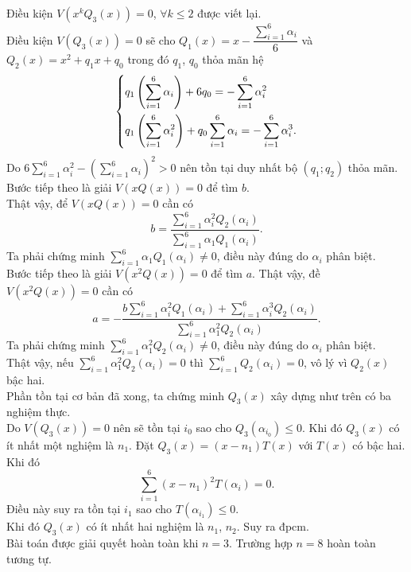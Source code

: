 \begin{bt}
{		Điều kiện $V\left(x^kQ_3(x)\right)=0$, $\forall k\le 2$ được viết lại.\\
		Điều kiện $V\left(Q_3(x)\right)=0$ sẽ cho $Q_1(x)=x-\dfrac{\displaystyle\sum_{i=1}^6\alpha_i}{6}$ và $Q_2(x)=x^2+q_1x+q_0$ trong đó $q_1$, $q_0$ thỏa mãn hệ
		$$\left\{\begin{aligned} & q_1\left(\displaystyle\sum_{i=1}^6\alpha_i\right)+6q_0=-\displaystyle\sum_{i=1}^6\alpha_i^2\\
			& q_1\left(\displaystyle\sum_{i=1}^6\alpha_i^2\right)+q_0\displaystyle\sum_{i=1}^6\alpha_i=-\displaystyle\sum_{i=1}^6\alpha_i^3.\end{aligned}\right.$$
		Do $6\displaystyle\sum_{i=1}^6\alpha_i^2-\left(\displaystyle\sum_{i=1}^6\alpha_i\right)^2>0$ nên tồn tại duy nhất bộ $(q_1;q_2)$ thỏa mãn.\\
		Bước tiếp theo là giải $V(xQ(x))=0$ để tìm $b$.\\
		Thật vậy, để $V\left(xQ(x)\right)=0$ cần có
		$$b=\dfrac{\displaystyle\sum_{i=1}^6\alpha_i^2Q_2\left(\alpha_i\right)}{\displaystyle\sum_{i=1}^6\alpha_1Q_1\left(\alpha_i\right)}.$$
		Ta phải chứng minh $\displaystyle\sum_{i=1}^6\alpha_1Q_1\left(\alpha_i\right)\neq 0$, điều này đúng do $\alpha_i$ phân biệt.\\
		Bước tiếp theo là giải $V\left(x^2Q(x)\right)=0$ để tìm $a$. Thật vậy, đề $V\left(x^2Q(x)\right)=0$ cần có
		$$a=-\dfrac{b\displaystyle\sum_{i=1}^6\alpha_i^2Q_1\left(\alpha_i\right)+\displaystyle\sum_{i=1}^6\alpha_i^3Q_2\left(\alpha_i\right)}{\displaystyle\sum_{i=1}^6\alpha_1^2Q_2\left(\alpha_i\right)}.$$
		Ta phải chứng minh $\displaystyle\sum_{i=1}^6\alpha_1^2Q_2\left(\alpha_i\right)\neq 0$, điều này đúng do $\alpha_i$ phân biệt.\\
		Thật vậy, nếu $\displaystyle\sum_{i=1}^6\alpha_1^2Q_2\left(\alpha_i\right)= 0$ thì $\displaystyle\sum_{i=1}^6Q_2\left(\alpha_i\right)= 0$, vô lý vì $Q_2(x)$ bậc hai.\\
		Phần tồn tại cơ bản đã xong, ta chứng minh $Q_3(x)$ xây dựng như trên có ba nghiệm thực.\\
		Do $V\left(Q_3(x)\right)=0$ nên sẽ tồn tại $i_0$ sao cho $Q_3\left(\alpha_{i_0}\right)\le 0$. Khi đó $Q_3(x)$ có ít nhất một nghiệm là $n_1$. Đặt $Q_3(x)=\left(x-n_1\right)T(x)$ với $T(x)$ có bậc hai. Khi đó
		$$\displaystyle\sum_{i=1}^6(x-n_1)^2T\left(\alpha_i\right)=0.$$
		Điều này suy ra tồn tại $i_1$ sao cho $T\left(\alpha_{i_1}\right)\le 0$.\\
		Khi đó $Q_3(x)$ có ít nhất hai nghiệm là $n_1$, $n_2$. Suy ra đpcm.\\
		Bài toán được giải quyết hoàn toàn khi $n=3$. Trường hợp $n=8$ hoàn toàn tương tự.
	}
\end{bt}

